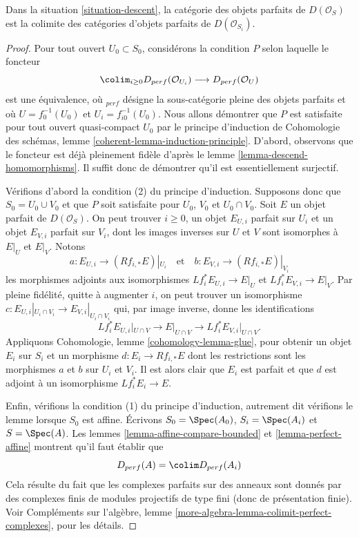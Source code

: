 \begin{lemma}
\label{lemma-descend-perfect}
Dans la situation \ref{situation-descent}, la catégorie des objets parfaits
de $D(\mathcal{O}_S)$ est la colimite des catégories
d'objets parfaits de $D(\mathcal{O}_{S_i})$.
\end{lemma}

\begin{proof}
Pour tout ouvert $U_0 \subset S_0$, considérons la condition $P$ selon laquelle
le foncteur
$$
\colim_{i \geq 0} D_{perf}(\mathcal{O}_{U_i})
\longrightarrow
D_{perf}(\mathcal{O}_U)
$$
est une équivalence, où ${}_{perf}$ désigne la sous-catégorie pleine des
objets parfaits et où $U = f_0^{-1}(U_0)$ et $U_i = f_{i0}^{-1}(U_0)$.
Nous allons démontrer que $P$ est satisfaite pour tout ouvert quasi-compact $U_0$
par le principe d'induction de
Cohomologie des schémas, lemme \ref{coherent-lemma-induction-principle}.
D'abord, observons que le foncteur est déjà pleinement fidèle
d'après le lemme \ref{lemma-descend-homomorphisms}. Il suffit donc de démontrer
qu'il est essentiellement surjectif.

\medskip\noindent
Vérifions d'abord la condition (2) du principe d'induction. Supposons donc
que $S_0 = U_0 \cup V_0$ et que $P$ soit satisfaite pour
$U_0$, $V_0$ et $U_0 \cap V_0$. Soit $E$ un objet parfait
de $D(\mathcal{O}_S)$. On peut trouver $i \geq 0$, un objet $E_{U, i}$ parfait sur $U_i$
et un objet $E_{V, i}$ parfait sur $V_i$, dont les images inverses sur $U$ et $V$ sont isomorphes
à $E|_U$ et $E|_V$. Notons
$$
a : E_{U, i} \to (Rf_{i, *}E)|_{U_i}
\quad\text{et}\quad
b : E_{V, i} \to (Rf_{i, *}E)|_{V_i}
$$
les morphismes adjoints aux isomorphismes $Lf_i^*E_{U, i} \to E|_U$
et $Lf_i^*E_{V, i} \to E|_V$.
Par pleine fidélité, quitte à augmenter $i$,
on peut trouver un isomorphisme
$c : E_{U, i}|_{U_i \cap V_i} \to E_{V, i}|_{U_i \cap V_i}$
qui, par image inverse, donne les identifications
$$
Lf_i^*E_{U, i}|_{U \cap V} \to E|_{U \cap V} \to Lf_i^*E_{V, i}|_{U \cap V}.
$$
Appliquons Cohomologie, lemme \ref{cohomology-lemma-glue},
pour obtenir un objet $E_i$ sur $S_i$ et un morphisme $d : E_i \to Rf_{i, *}E$
dont les restrictions sont les morphismes $a$ et $b$ sur $U_i$ et $V_i$.
Il est alors clair que $E_i$ est parfait et que
$d$ est adjoint à un isomorphisme $Lf_i^*E_i \to E$.

\medskip\noindent
Enfin, vérifions la condition (1) du principe d'induction, autrement
dit vérifions le lemme lorsque $S_0$ est affine.
Écrivons $S_0 = \Spec(A_0)$, $S_i = \Spec(A_i)$ et
$S = \Spec(A)$. Les lemmes \ref{lemma-affine-compare-bounded}
et \ref{lemma-perfect-affine} montrent qu'il faut établir que
$$
D_{perf}(A) = \colim D_{perf}(A_i)
$$
Cela résulte du fait que les complexes parfaits sur des anneaux sont
donnés par des complexes finis de modules projectifs de type fini (donc de présentation finie).
Voir Compléments sur l'algèbre, lemme
\ref{more-algebra-lemma-colimit-perfect-complexes}, pour les détails.
\end{proof}





